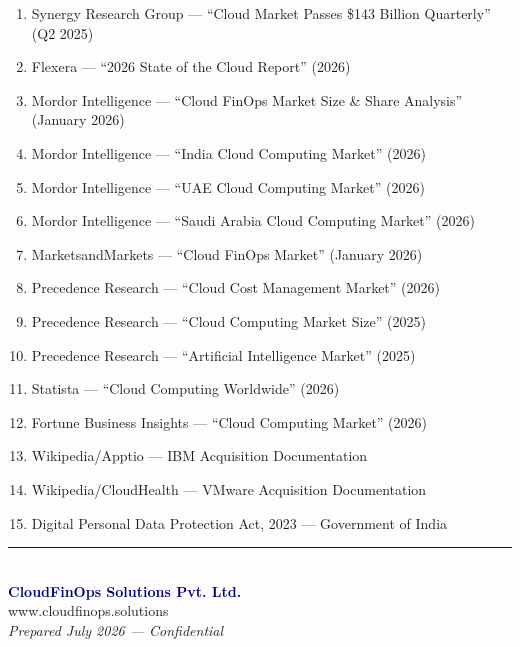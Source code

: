\documentclass[a4paper,11pt]{article}
\begin{document}
\begin{enumerate}[itemsep=1mm]
    \item Synergy Research Group --- ``Cloud Market Passes \$143 Billion Quarterly'' (Q2 2025)
    \item Flexera --- ``2026 State of the Cloud Report'' (2026)
    \item Mordor Intelligence --- ``Cloud FinOps Market Size \& Share Analysis'' (January 2026)
    \item Mordor Intelligence --- ``India Cloud Computing Market'' (2026)
    \item Mordor Intelligence --- ``UAE Cloud Computing Market'' (2026)
    \item Mordor Intelligence --- ``Saudi Arabia Cloud Computing Market'' (2026)
    \item MarketsandMarkets --- ``Cloud FinOps Market'' (January 2026)
    \item Precedence Research --- ``Cloud Cost Management Market'' (2026)
    \item Precedence Research --- ``Cloud Computing Market Size'' (2025)
    \item Precedence Research --- ``Artificial Intelligence Market'' (2025)
    \item Statista --- ``Cloud Computing Worldwide'' (2026)
    \item Fortune Business Insights --- ``Cloud Computing Market'' (2026)
    \item Wikipedia/Apptio --- IBM Acquisition Documentation
    \item Wikipedia/CloudHealth --- VMware Acquisition Documentation
    \item Digital Personal Data Protection Act, 2023 --- Government of India
\end{enumerate}

\vfill
\begin{center}
\textcolor{slate}{\rule{0.5\textwidth}{0.4pt}}\\[0.5cm]
\textcolor{navy}{\textbf{CloudFinOps Solutions Pvt. Ltd.}}\\
\textcolor{slate}{www.cloudfinops.solutions}\\[0.3cm]
\textcolor{slate}{\textit{Prepared July 2026 --- Confidential}}
\end{center}
\end{document}
